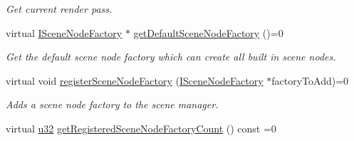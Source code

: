 \begin{DoxyCompactItemize}
\begin{DoxyCompactList}\small\item\em Get current render pass. \end{DoxyCompactList}\item 
virtual \hyperlink{classirr_1_1scene_1_1ISceneNodeFactory}{I\+Scene\+Node\+Factory} $\ast$ \hyperlink{classirr_1_1scene_1_1ISceneManager_a1ea0ec7ec95a97819f1de5222b97e774}{get\+Default\+Scene\+Node\+Factory} ()=0
\begin{DoxyCompactList}\small\item\em Get the default scene node factory which can create all built in scene nodes. \end{DoxyCompactList}\item 
virtual void \hyperlink{classirr_1_1scene_1_1ISceneManager_a75ac9315def74ae5e26a2d6a2f5a38e9}{register\+Scene\+Node\+Factory} (\hyperlink{classirr_1_1scene_1_1ISceneNodeFactory}{I\+Scene\+Node\+Factory} $\ast$factory\+To\+Add)=0
\begin{DoxyCompactList}\small\item\em Adds a scene node factory to the scene manager. \end{DoxyCompactList}\item 
virtual \hyperlink{namespaceirr_a0416a53257075833e7002efd0a18e804}{u32} \hyperlink{classirr_1_1scene_1_1ISceneManager_a6297be8248b8bada0de1bf7f56753c63}{get\+Registered\+Scene\+Node\+Factory\+Count} () const  =0\hypertarget{classirr_1_1scene_1_1ISceneManager_a6297be8248b8bada0de1bf7f56753c63}{}\label{classirr_1_1scene_1_1ISceneManager_a6297be8248b8bada0de1bf7f56753c63}


\end{DoxyCompactItemize}
